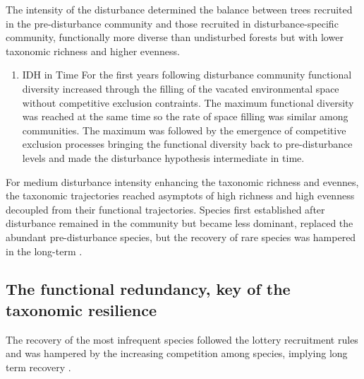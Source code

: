 \documentclass[fleqn,10pt]{ArtEcoFoG} %
\providecommand{\tightlist}{%
  \setlength{\itemsep}{0pt}\setlength{\parskip}{0pt}}
\begin{document}
The intensity of the disturbance determined the balance between trees
recruited in the pre-disturbance community and those recruited in
disturbance-specific community, functionally more diverse than
undisturbed forests but with lower taxonomic richness and higher
evenness.

\begin{enumerate}
\def\labelenumi{\arabic{enumi}.}
\setcounter{enumi}{1}
\tightlist
\item
  IDH in Time For the first years following disturbance community
  functional diversity increased through the filling of the vacated
  environmental space without competitive exclusion contraints. The
  maximum functional diversity was reached at the same time so the rate
  of space filling was similar among communities. The maximum was
  followed by the emergence of competitive exclusion processes bringing
  the functional diversity back to pre-disturbance levels and made the
  disturbance hypothesis intermediate in time.
\end{enumerate}

For medium disturbance intensity enhancing the taxonomic richness and
evennes, the taxonomic trajectories reached asymptots of high richness
and high evenness decoupled from their functional trajectories. Species
first established after disturbance remained in the community but became
less dominant, replaced the abundant pre-disturbance species, but the
recovery of rare species was hampered in the long-term
\citep{Hubbell2001, Chave2004}.

\subsection{The functional redundancy, key of the taxonomic
resilience}\label{the-functional-redundancy-key-of-the-taxonomic-resilience}

The recovery of the most infrequent species followed the lottery
recruitment rules \citep{Busing2002} and was hampered by the increasing
competition among species, implying long term recovery
\citep{Trenbath1999, Elmqvist2003, Diaz2005}.
\end{document}
